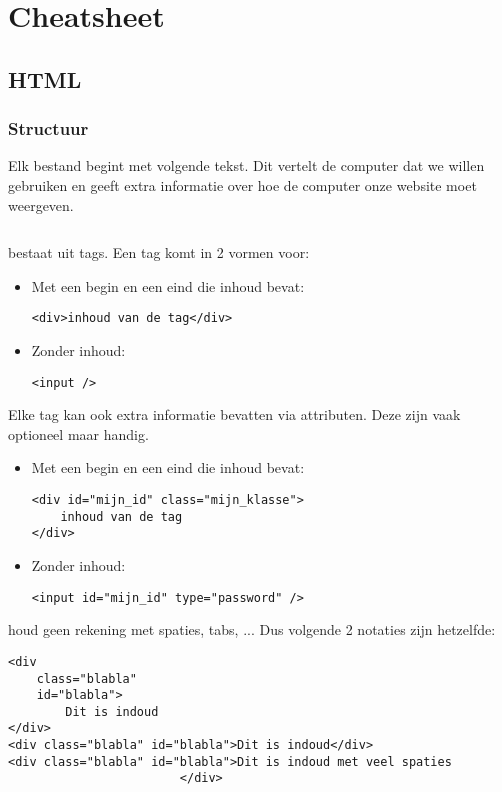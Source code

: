 \chapter*{Cheatsheet}%

\section{HTML}%
\label{sec:html}

\subsection{Structuur}%
\label{sub:structuur}

Elk \HTML bestand begint met volgende tekst. Dit vertelt de computer dat we \HTML willen gebruiken en geeft extra informatie over hoe de computer onze website moet weergeven.
\inputminted{html}{../cheatsheet/basis_html.html}

\HTML bestaat uit tags. Een tag komt in 2 vormen voor:
\begin{itemize}
    \item Met een begin en een eind die inhoud bevat:
        \begin{verbatim}
<div>inhoud van de tag</div>
        \end{verbatim}
    \item Zonder inhoud:
        \begin{verbatim}
<input />
        \end{verbatim}
\end{itemize}

Elke tag kan ook extra informatie bevatten via attributen. Deze zijn vaak optioneel maar handig.

\begin{itemize}
    \item Met een begin en een eind die inhoud bevat:
        \begin{verbatim}
<div id="mijn_id" class="mijn_klasse">
    inhoud van de tag
</div>
        \end{verbatim}
    \item Zonder inhoud:
        \begin{verbatim}
<input id="mijn_id" type="password" />
        \end{verbatim}
\end{itemize}

\Opm \HTML houd geen rekening met spaties, tabs, ... Dus volgende 2 notaties zijn hetzelfde:
\begin{verbatim}
<div
    class="blabla"
    id="blabla">
        Dit is indoud
</div>
<div class="blabla" id="blabla">Dit is indoud</div>
<div class="blabla" id="blabla">Dit is indoud met veel spaties
                        </div>
\end{verbatim}

